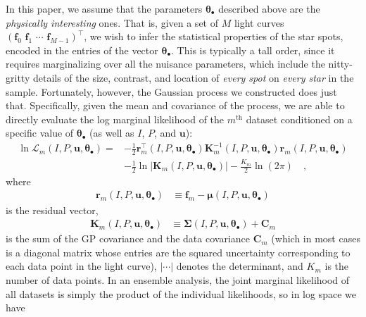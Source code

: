 \documentclass[modern]{aastex62}
\begin{document}
In this paper, we assume that the parameters $\pmb{\theta}_\bullet$
described above are the \emph{physically interesting} ones. That is,
given a set of $M$ light curves
$\left( \mathbf{f}_0 \,\, \mathbf{f}_1 \,\, \cdots \,\,  \mathbf{f}_{M-1} \right)^\top$,
we wish to infer the statistical properties of the star spots, encoded in
the entries of the vector $\pmb{\theta}_\bullet$.
%
This is typically a tall order, since it requires marginalizing over all
the nuisance parameters, which include the nitty-gritty details of the
size, contrast, and location of \emph{every spot} on \emph{every star}
in the sample. Fortunately, however, the Gaussian process we constructed
does just that. Specifically, given the mean and covariance of the process,
we are able to directly evaluate the log marginal likelihood of the $m^\mathrm{th}$
dataset
conditioned on a specific value of $\pmb{\theta}_\bullet$ (as well as $I$,
$P$, and $\mathbf{u}$):
%
\begin{align}
    \label{eq:log-like}
    \ln \mathcal{L}_m\left(I, P, \mathbf{u}, \pmb{\theta}_\bullet\right)
    =
     & -\frac{1}{2}
    \mathbf{r}_m^\top\left(I, P, \mathbf{u}, \pmb{\theta}_\bullet\right)
    \mathbf{K}_m^{-1}\left(I, P, \mathbf{u}, \pmb{\theta}_\bullet\right)
    \mathbf{r}_m\left(I, P, \mathbf{u}, \pmb{\theta}_\bullet\right)
    \nonumber       \\[0.75em]
     & -
    \frac{1}{2}
    \ln \Big| \mathbf{K}_m\left(I, P, \mathbf{u}, \pmb{\theta}_\bullet\right) \Big|
    -
    \frac{K_m}{2}
    \ln \left( 2 \pi \right)
    \quad,
\end{align}
%
where
%
\begin{align}
    \mathbf{r}_m\left(I, P, \mathbf{u}, \pmb{\theta}_\bullet\right)
     & \equiv
    \mathbf{f}_m - \pmb{\mu}\left(I, P, \mathbf{u}, \pmb{\theta}_\bullet\right)
\end{align}
%
is the residual vector,
%
\begin{align}
    \mathbf{K}_m\left(I, P, \mathbf{u}, \pmb{\theta}_\bullet\right)
     & \equiv
    \pmb{\Sigma}\left(I, P, \mathbf{u}, \pmb{\theta}_\bullet\right)
    +
    \mathbf{C}_m
\end{align}
%
is the sum of the GP covariance and the data covariance $\mathbf{C}_m$
(which in most cases is a diagonal matrix whose entries
are the squared uncertainty corresponding to each data point in the light curve),
%
$| \cdots |$ denotes the determinant, and $K_m$ is the number of data points.
In an ensemble analysis, the joint marginal likelihood of all datasets is
simply the product of the individual likelihoods, so in log space we have
\end{document}
